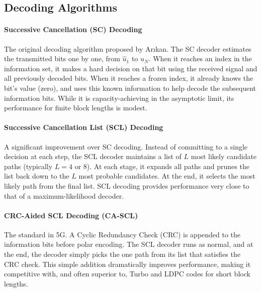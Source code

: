 \subsection{Decoding Algorithms}

\paragraph{Successive Cancellation (SC) Decoding}
The original decoding algorithm proposed by Arıkan. The SC decoder estimates the transmitted bits one by one, from $\hat{u}_1$ to $\hat{u}_N$. When it reaches an index in the information set, it makes a hard decision on that bit using the received signal and all previously decoded bits. When it reaches a frozen index, it already knows the bit's value (zero), and uses this known information to help decode the subsequent information bits. While it is capacity-achieving in the asymptotic limit, its performance for finite block lengths is modest.

\paragraph{Successive Cancellation List (SCL) Decoding}
A significant improvement over SC decoding. Instead of committing to a single decision at each step, the SCL decoder maintains a list of $L$ most likely candidate paths (typically $L=4$ or 8). At each stage, it expands all paths and prunes the list back down to the $L$ most probable candidates. At the end, it selects the most likely path from the final list. SCL decoding provides performance very close to that of a maximum-likelihood decoder.

\paragraph{CRC-Aided SCL Decoding (CA-SCL)}
The standard in 5G. A Cyclic Redundancy Check (CRC) is appended to the information bits before polar encoding. The SCL decoder runs as normal, and at the end, the decoder simply picks the one path from its list that satisfies the CRC check. This simple addition dramatically improves performance, making it competitive with, and often superior to, Turbo and LDPC codes for short block lengths.

